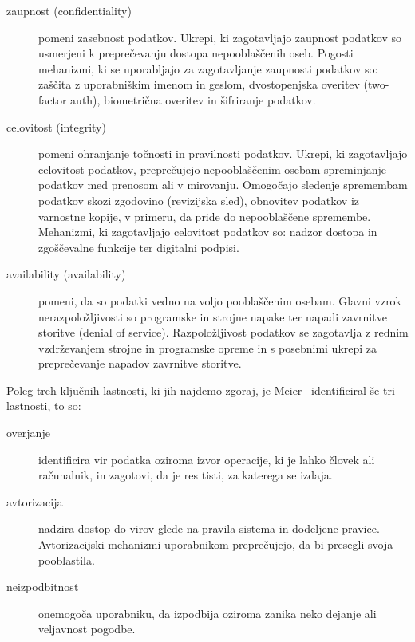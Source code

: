 \documentclass[12pt,a4paper,openany,tikz]{book}
\theoremstyle{plain}
\theoremstyle{definition}
\begin{document}
\begin{description}
\item[\Gls{zaupnost} (confidentiality)] pomeni zasebnost podatkov. Ukrepi, ki zagotavljajo zaupnost podatkov so usmerjeni k preprečevanju dostopa nepooblaščenih oseb. Pogosti mehanizmi, ki se uporabljajo za zagotavljanje zaupnosti podatkov so: zaščita z uporabniškim imenom in geslom, dvostopenjska overitev (two-factor auth), biometrična overitev in šifriranje podatkov.

\item[\Gls{celovitost} (integrity)] pomeni ohranjanje točnosti in pravilnosti podatkov. Ukrepi, ki zagotavljajo celovitost podatkov, preprečujejo nepooblaščenim osebam spreminjanje podatkov med prenosom ali v mirovanju. Omogočajo sledenje spremembam podatkov skozi zgodovino (revizijska sled), obnovitev podatkov iz varnostne kopije, v primeru, da pride do nepooblaščene spremembe. Mehanizmi, ki zagotavljajo celovitost podatkov so: nadzor dostopa in zgoščevalne funkcije ter digitalni podpisi.

\item[\Gls{availability} (availability)] pomeni, da so podatki vedno na voljo pooblaščenim osebam. Glavni vzrok nerazpoložljivosti so programske in strojne napake ter napadi zavrnitve storitve (denial of service). Razpoložljivost podatkov se zagotavlja z rednim vzdrževanjem strojne in programske opreme in s posebnimi ukrepi za preprečevanje napadov zavrnitve storitve.

\end{description}

Poleg treh ključnih lastnosti, ki jih najdemo zgoraj, je Meier~\cite{meier2003improving} identificiral še tri lastnosti, to so:

\begin{description}

\item[\Gls{overjanje}] identificira vir podatka oziroma izvor operacije, ki je lahko človek ali računalnik, in zagotovi, da je res tisti, za katerega se izdaja.

\item[\Gls{avtorizacija}] nadzira dostop do virov glede na pravila sistema in dodeljene pravice. Avtorizacijski mehanizmi uporabnikom preprečujejo, da bi presegli svoja pooblastila.

\item[\Gls{neizpodbitnost}] onemogoča uporabniku, da izpodbija oziroma zanika neko dejanje ali veljavnost pogodbe.

\end{description}
\end{document}
